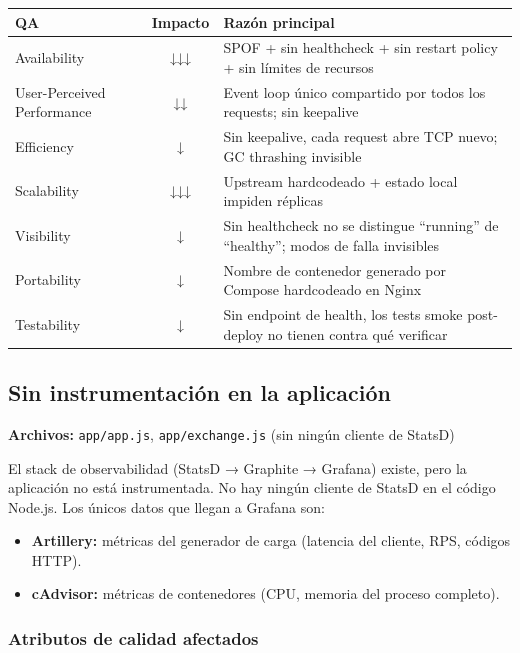 \begin{table}[H]
\centering
\begin{tabular}{lcp{8cm}}
\toprule
\textbf{QA} & \textbf{Impacto} & \textbf{Razón principal} \\
\midrule
Availability & ↓↓↓ & SPOF + sin healthcheck + sin restart policy + sin límites de recursos \\
User-Perceived Performance & ↓↓ & Event loop único compartido por todos los requests; sin keepalive \\
Efficiency & ↓ & Sin keepalive, cada request abre TCP nuevo; GC thrashing invisible \\
Scalability & ↓↓↓ & Upstream hardcodeado + estado local impiden réplicas \\
Visibility & ↓ & Sin healthcheck no se distingue ``running'' de ``healthy''; modos de falla invisibles \\
Portability & ↓ & Nombre de contenedor generado por Compose hardcodeado en Nginx \\
Testability & ↓ & Sin endpoint de health, los tests smoke post-deploy no tienen contra qué verificar \\
\bottomrule
\end{tabular}
\end{table}

\subsection{Sin instrumentación en la aplicación}

\textbf{Archivos:} \texttt{app/app.js}, \texttt{app/exchange.js} (sin ningún cliente de StatsD)

El stack de observabilidad (StatsD → Graphite → Grafana) existe, pero la aplicación no está instrumentada. No hay ningún cliente de StatsD en el código Node.js. Los únicos datos que llegan a Grafana son:
\begin{itemize}
    \item \textbf{Artillery:} métricas del generador de carga (latencia del cliente, RPS, códigos HTTP).
    \item \textbf{cAdvisor:} métricas de contenedores (CPU, memoria del proceso completo).
\end{itemize}

\subsubsection{Atributos de calidad afectados}

